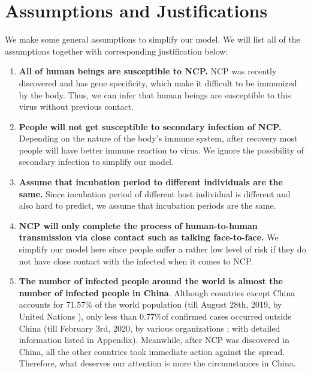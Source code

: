\documentclass{mcmthesis}
\begin{document}
\section{Assumptions and Justifications}\label{S2}
    We make some general assumptions to simplify our model. We will list all of the assumptions together with corresponding justification below:
\begin{enumerate}[1)]
	\item {\bfseries All of human beings are susceptible to NCP.} NCP was recently discovered and has gene specificity, which make it difficult to be immunized by the body. Thus, we can infer that human beings are susceptible to this virus without previous contact.
	\item {\bfseries People will not get susceptible to secondary infection of NCP.} Depending on the nature of the body's immune system, after recovery most people will have better immune reaction to virus. We ignore the possibility of secondary infection to simplify our model.
	\item {\bfseries Assume that incubation period to different individuals are the same.} Since incubation period of different host individual is different and also hard to predict, we assume that incubation periods are the same.
	\item {\bfseries NCP will only complete the process of human-to-human transmission via close contact such as talking face-to-face.} We simplify our model here since people suffer a rather low  level of risk if they do not have close contact with the infected when it comes to NCP.
	\item {\bfseries The number of infected people around the world is almost the number of infected people in China}. Although countries except China accounts for 71.57\% of the world population \small{(till August 28th, 2019, by United Nations \cite{pop_un})}, only less than  0.77\%of confirmed cases occurred outside China \small{(till February 3rd, 2020, by various organizations \cite{cov_who}\cite{cov_tencent}\cite{cov-jhu}\cite{cov-cdc}; with detailed information listed in Appendix)}. Meanwhile, after NCP was discovered in China, all the other countries took immediate action against the spread. Therefore, what deserves our attention is more the circumstances in China.
\end{enumerate}
\end{document}
